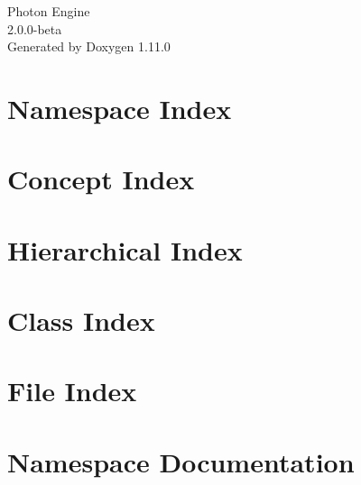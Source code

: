 \documentclass[twoside]{book}
\newcommand{\+}{\discretionary{\mbox{\scriptsize$\hookleftarrow$}}{}{}}
\newcommand{\clearemptydoublepage}{%
    \newpage{\pagestyle{empty}\cleardoublepage}%
  }
\begin{document}
  \raggedbottom
    \hypersetup{pageanchor=false,
                bookmarksnumbered=true,
                pdfencoding=unicode
               }
  \begin{titlepage}
  \vspace*{7cm}
  \begin{center}%
  {\Large Photon Engine}\\
  [1ex]\large 2.\+0.\+0-\/beta \\
  \vspace*{1cm}
  {\large Generated by Doxygen 1.11.0}\\
  \end{center}
  \end{titlepage}
  \clearemptydoublepage
  \tableofcontents
  \clearemptydoublepage
  \hypersetup{pageanchor=true}


\chapter{Namespace Index}

\chapter{Concept Index}

\chapter{Hierarchical Index}

\chapter{Class Index}

\chapter{File Index}

\chapter{Namespace Documentation}




























\end{document}
